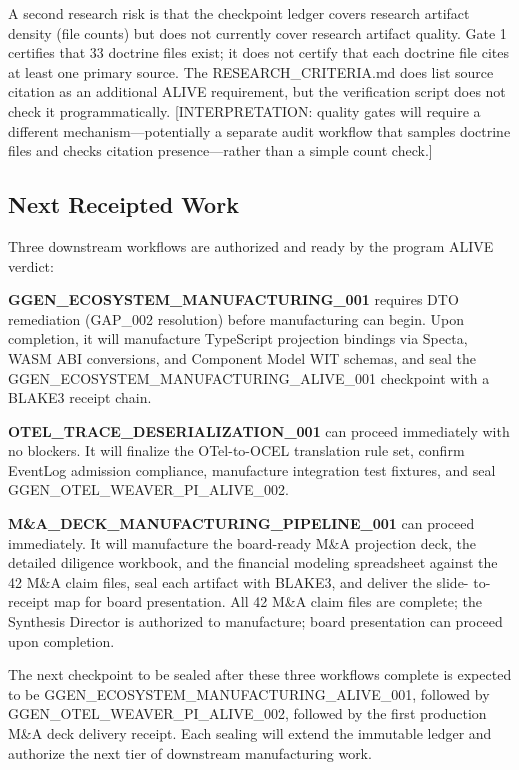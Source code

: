 A second research risk is that the checkpoint ledger covers research artifact density (file counts)
but does not currently cover research artifact quality. Gate 1 certifies that 33 doctrine files
exist; it does not certify that each doctrine file cites at least one primary source. The
RESEARCH\_CRITERIA.md does list source citation as an additional ALIVE requirement, but the
verification script does not check it programmatically. [INTERPRETATION: quality gates will require
a different mechanism---potentially a separate audit workflow that samples doctrine files and checks
citation presence---rather than a simple count check.]

\subsection{Next Receipted Work}
\label{sec:checkpoints-open-questions-next-work}

Three downstream workflows are authorized and ready by the program ALIVE verdict:

\textbf{GGEN\_ECOSYSTEM\_MANUFACTURING\_001} requires DTO remediation (GAP\_002 resolution) before
manufacturing can begin. Upon completion, it will manufacture TypeScript projection bindings via
Specta, WASM ABI conversions, and Component Model WIT schemas, and seal the
GGEN\_ECOSYSTEM\_MANUFACTURING\_ALIVE\_001 checkpoint with a BLAKE3 receipt chain.

\textbf{OTEL\_TRACE\_DESERIALIZATION\_001} can proceed immediately with no blockers. It will finalize
the OTel-to-OCEL translation rule set, confirm EventLog admission compliance, manufacture integration
test fixtures, and seal GGEN\_OTEL\_WEAVER\_PI\_ALIVE\_002.

\textbf{M\&A\_DECK\_MANUFACTURING\_PIPELINE\_001} can proceed immediately. It will manufacture the
board-ready M\&A projection deck, the detailed diligence workbook, and the financial modeling
spreadsheet against the 42 M\&A claim files, seal each artifact with BLAKE3, and deliver the slide-
to-receipt map for board presentation. All 42 M\&A claim files are complete; the Synthesis Director
is authorized to manufacture; board presentation can proceed upon completion.

The next checkpoint to be sealed after these three workflows complete is expected to be
GGEN\_ECOSYSTEM\_MANUFACTURING\_ALIVE\_001, followed by GGEN\_OTEL\_WEAVER\_PI\_ALIVE\_002, followed
by the first production M\&A deck delivery receipt. Each sealing will extend the immutable ledger
and authorize the next tier of downstream manufacturing work.
